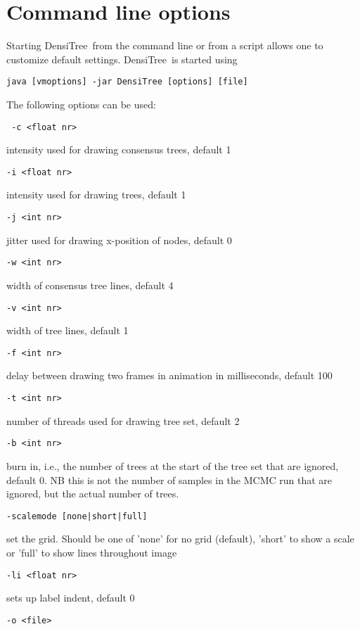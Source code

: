 \documentclass{article}
\def\DensiTree{DensiTree}
\begin{document}
\newpage
\section{Command line options\label{sec.cmd}}

Starting \DensiTree\ from the command line or from a script allows
one to customize default settings. \DensiTree\ is started using
\begin{verbatim} 
java [vmoptions] -jar DensiTree [options] [file]
\end{verbatim}
The following options can be used:
\begin{verbatim} -c <float nr>\end{verbatim}
 intensity used for drawing consensus trees, default 1
\begin{verbatim}-i <float nr>\end{verbatim}
 intensity used for drawing trees, default 1
\begin{verbatim}-j <int nr>\end{verbatim}
jitter used for drawing x-position of nodes, default 0
\begin{verbatim}-w <int nr>\end{verbatim}
width of consensus tree lines, default 4
\begin{verbatim}-v <int nr>\end{verbatim}
width of tree lines, default 1
\begin{verbatim}-f <int nr>\end{verbatim}
delay between drawing two frames in animation in milliseconds, default 100
\begin{verbatim}-t <int nr>\end{verbatim}
number of threads used for drawing tree set, default 2
\begin{verbatim}-b <int nr>\end{verbatim}
burn in, i.e., the number of trees at the start of the tree set that are ignored, default 0. NB this is not the number of samples in
the MCMC run that are ignored, but the actual number of trees.
\begin{verbatim}-scalemode [none|short|full]\end{verbatim}
set the grid. Should be one of 'none' for no grid (default), 'short' to show a scale or 'full' to show lines throughout image
\begin{verbatim}-li <float nr>\end{verbatim}
sets up label indent, default 0
\begin{verbatim}-o <file>\end{verbatim}
\end{document}

